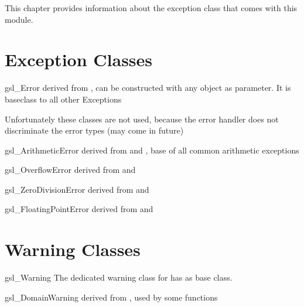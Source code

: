 
This chapter provides information about the  exception class that comes with this module.

\section{Exception Classes}

\begin{excclassdesc} {gsl_Error}{}
derived from , can be constructed with any object as parameter.
It is baseclass to all other \gsl{} Exceptions
\end{excclassdesc}

Unfortunately these classes are not used, because the error handler does not discriminate the error types (may come in future)

\begin{excclassdesc}{gsl_ArithmeticError}{}
derived from  and ,
base of all common arithmetic exceptions
\end{excclassdesc}

\begin{excclassdesc}{gsl_OverflowError}{}
derived from  and 
\end{excclassdesc}

\begin{excclassdesc}{gsl_ZeroDivisionError}{}
derived from  and 
\end{excclassdesc}

\begin{excclassdesc}{gsl_FloatingPointError}{}
derived from  and 
\end{excclassdesc}

\section{Warning Classes}

\begin{excclassdesc} {gsl_Warning}{}
The dedicated warning class for \gsl{} has  as base class.
\end{excclassdesc}

\begin{excclassdesc}{gsl_DomainWarning}{}
derived from , used by some  functions
\end{excclassdesc}

